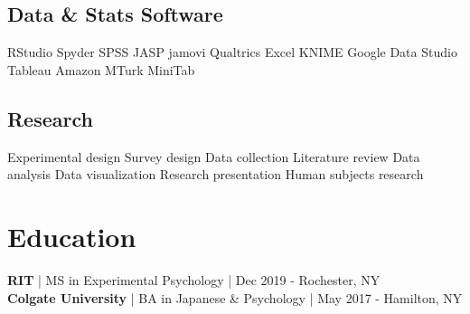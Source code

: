 \documentclass[letterpaper]{deedy-resume_sm} %
\begin{document}
\subsection{Data \& Stats Software}
RStudio \textbullet{} Spyder \textbullet{} SPSS \textbullet{} JASP \textbullet{} jamovi \textbullet{} Qualtrics \textbullet{} Excel \textbullet{} KNIME \textbullet{} Google Data Studio \textbullet{} Tableau \textbullet{} Amazon MTurk \textbullet{} MiniTab
\subsection{Research}
Experimental design \textbullet{} Survey design \textbullet{} Data collection \textbullet{} Literature review \textbullet{} Data analysis \textbullet{} Data visualization \textbullet{} Research presentation \textbullet{} Human subjects research %


\section{Education} 
\textbf{RIT} | MS in Experimental Psychology | Dec 2019 - Rochester, NY\\
\textbf{Colgate University} | BA in Japanese \& Psychology | May 2017 - Hamilton, NY\\
\end{document}
